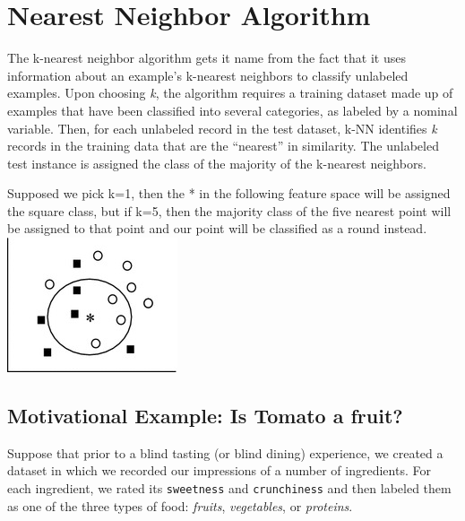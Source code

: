 \documentclass[
]{article}
\begin{document}
\hypertarget{nearest-neighbor-algorithm}{%
\section{Nearest Neighbor Algorithm}\label{nearest-neighbor-algorithm}}

The k-nearest neighbor algorithm gets it name from the fact that it uses
information about an example's k-nearest neighbors to classify unlabeled
examples. Upon choosing \emph{k}, the algorithm requires a training
dataset made up of examples that have been classified into several
categories, as labeled by a nominal variable. Then, for each unlabeled
record in the test dataset, k-NN identifies \emph{k} records in the
training data that are the ``nearest'' in similarity. The unlabeled test
instance is assigned the class of the majority of the k-nearest
neighbors.

Supposed we pick k=1, then the * in the following feature space will be
assigned the square class, but if k=5, then the majority class of the
five nearest point will be assigned to that point and our point will be
classified as a round instead. \includegraphics{assets/knn.jpg}

\hypertarget{motivational-example-is-tomato-a-fruit}{%
\subsection{Motivational Example: Is Tomato a
fruit?}\label{motivational-example-is-tomato-a-fruit}}

Suppose that prior to a blind tasting (or blind dining) experience, we
created a dataset in which we recorded our impressions of a number of
ingredients. For each ingredient, we rated its \texttt{sweetness} and
\texttt{crunchiness} and then labeled them as one of the three types of
food: \emph{fruits}, \emph{vegetables}, or \emph{proteins}.
\end{document}
